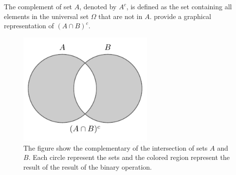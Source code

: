 \begin{definition}[Complementation]
	The complement of set $A$, denoted by $A^c$, is defined as the set containing all elements in the universal set $\Omega$ that are not in $A$.  provide a graphical representation of $(A \cap B)^c$.
	\begin{figure}[H]
		\centering
		\includegraphics[width = 0.6\textwidth]{figures/set_complementary.pdf}
		\caption{The figure show the complementary of the intersection of sets $A$ and $B$. Each circle represent the sets and the colored region represent the result of the result of the binary operation.}
		\label{fig:set_complementation}
	\end{figure}
\end{definition}

